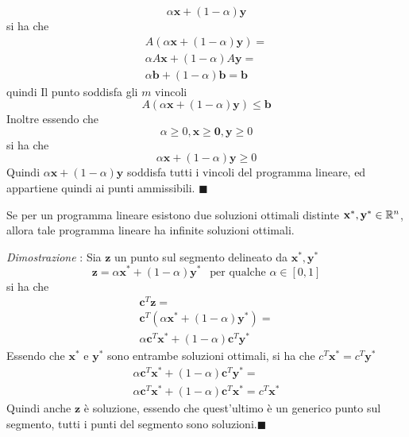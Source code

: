 \documentclass[10pt, letterpaper]{report}
\begin{document}
$$\alpha\mathbf x +(1-\alpha)\mathbf y $$ 
si ha che \begin{eqnarray}
    A(\alpha\mathbf x +(1-\alpha)\mathbf y)=\\ 
    \alpha A \mathbf x + (1-\alpha)A\mathbf y = \\ 
    \alpha \mathbf b + (1-\alpha )\mathbf b = \mathbf b 
\end{eqnarray}
quindi Il punto soddisfa gli $m$ vincoli
$$A(\alpha\mathbf x +(1-\alpha)\mathbf y)\le \mathbf b $$
Inoltre essendo che 
$$ \alpha \ge 0, \mathbf x \ge \mathbf  0, \mathbf y \ge 0$$
si ha che 
$$ \alpha\mathbf x +(1-\alpha)\mathbf y\ge 0$$
Quindi $\alpha\mathbf x +(1-\alpha)\mathbf y$ soddisfa tutti i vincoli del programma lineare, ed appartiene quindi ai punti ammissibili.
\hfill$\blacksquare$
\begin{proposizione}
    Se per un programma lineare esistono due soluzioni ottimali distinte $\mathbf x^*,\mathbf y^*\in {\mathbb R}^n$, allora tale programma lineare ha infinite soluzioni ottimali.
\end{proposizione}
\textit{Dimostrazione} : Sia $ \mathbf z$ un punto sul segmento delineato da $\mathbf x^*,\mathbf y^*$
$$\mathbf z = \alpha\mathbf x^* +(1-\alpha)\mathbf y^* \ \ \text{ per qualche }\alpha \in [0,1] $$
si ha che 
 \begin{eqnarray}
    \mathbf c^T \mathbf z = \\
    \mathbf c^T(\alpha\mathbf x^*  +(1-\alpha)\mathbf y^*)=\\
    \alpha\mathbf c^T\mathbf x^*  +(1-\alpha)\mathbf c^T\mathbf y^*
\end{eqnarray}
Essendo che $\mathbf x^*$ e $\mathbf y^*$ sono entrambe soluzioni ottimali, si ha che $c^T\mathbf x^*=c^T\mathbf y^*$
\begin{eqnarray}
    \alpha\mathbf c^T\mathbf x^*  +(1-\alpha)\mathbf c^T\mathbf y^*=\\ 
    \alpha\mathbf c^T\mathbf x^*  +(1-\alpha)\mathbf c^T\mathbf x^*=
    c^T\mathbf x^*
\end{eqnarray}
Quindi anche $\mathbf z$ è soluzione, essendo che quest'ultimo è un generico punto sul segmento, tutti i punti del segmento sono soluzioni.\hfill$\blacksquare$
\end{document}
